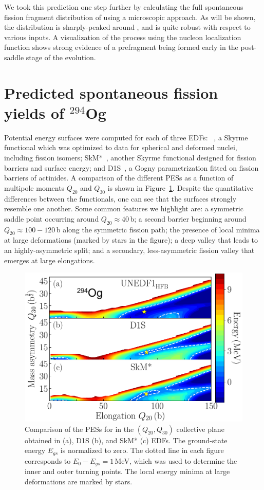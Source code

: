 We took this prediction one step further by calculating the full spontaneous fission fragment distribution of {\Og} using a microscopic approach. As will be shown, the distribution is sharply-peaked around {\Pb}, and is quite robust with respect to various inputs. A visualization of the process using the nucleon localization function shows strong evidence of a {\Pb} prefragment being formed early in the post-saddle stage of the evolution.

\section{Predicted spontaneous fission yields of $^{294}$Og}

Potential energy surfaces were computed for each of three EDFs: \hfb~\cite{Schunck2015}, a Skyrme functional which was optimized to data for spherical and deformed nuclei, including fission isomers; SkM*~\cite{Bartel1982}, another Skyrme functional designed for fission barriers and surface energy; and D1S~\cite{Berger1989}, a Gogny parametrization fitted on fission barriers of actinides. A comparison of the different PESs as a function of multipole moments $Q_{20}$ and $Q_{30}$ is shown in Figure~\ref{fig:294ogthreepes}. Despite the quantitative differences between the functionals, one can see that the surfaces strongly resemble one another. Some common features we highlight are: a symmetric saddle point occurring around $Q_{20}\approx 40$\,b; a second barrier beginning around $Q_{20}\approx100-120$\,b along the symmetric fission path; the presence of local minima at large deformations (marked by stars in the figure); a deep valley that leads to an highly-asymmetric split; and a secondary, less-asymmetric fission valley that emerges at large elongations.


\begin{figure}
	\centering
	\includegraphics[width=0.7\linewidth]{TeX_files/294Og_three_PES}
	\caption[PES comparison for $^{294}$Og using EDFs {\hfb}, D1S, and SkM*.]{Comparison of the PESs for \Og{} in the $(Q_{20},Q_{30})$ collective plane obtained in \hfb{} (a), D1S (b), and SkM* (c) EDFs. The ground-state energy $E_{gs}$ is normalized to zero. The dotted line in each figure corresponds to $E_0-E_{gs}=1$\,MeV, which was used to determine the inner and outer turning points. The local energy minima at large deformations are marked by stars.}
	\label{fig:294ogthreepes}
\end{figure}

